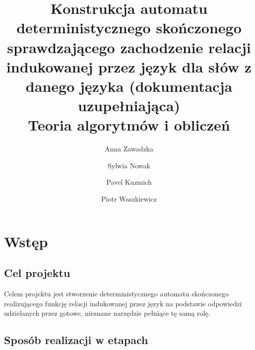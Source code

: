 \documentclass[runningheads,a4paper]{llncs}
\begin{document}
\vspace{-100pt}
\mainmatter  %
\title{Konstrukcja automatu deterministycznego skończonego sprawdzającego zachodzenie relacji indukowanej przez język dla słów z danego języka (dokumentacja uzupełniająca)\\Teoria algorytmów i obliczeń}


%
%
\author{Anna Zawadzka\and Sylwia Nowak\and Pavel Kuzmich\and Piotr Waszkiewicz}
%
\authorrunning{}

%
%

\maketitle

\tableofcontents

\section{Wstęp}

\subsection{Cel projektu}

Celem projektu jest stworzenie deterministycznego automatu skończonego realizującego funkcję relacji indukowanej przez język na podstawie odpowiedzi udzielanych przez gotowe, nieznane narzędzie pełniące tę samą rolę.

\subsection{Sposób realizacji w etapach}
\end{document}

